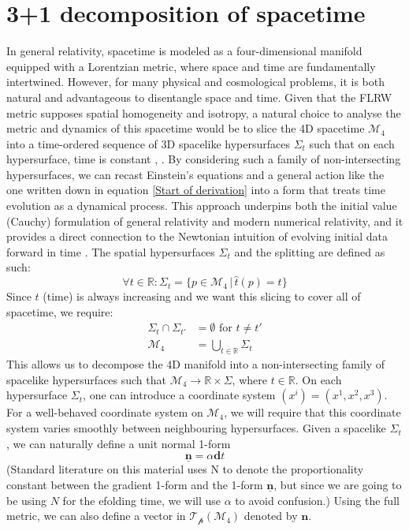 \documentclass[aps,prd,reprint,preprintnumbers,showpacs,floatfix,nofootinbib,superscript address]{revtex4-2}
\begin{document}
\section{3+1 decomposition of spacetime} \label{3+1 decomposition of spacetime}
In general relativity, spacetime is modeled as a four-dimensional manifold equipped with a Lorentzian metric, where space and time are fundamentally intertwined. However, for many physical and cosmological problems, it is both natural and advantageous to disentangle space and time. Given that the FLRW metric supposes spatial homogeneity and isotropy, a natural choice to analyse the metric and dynamics of this spacetime would be to slice the 4D spacetime $\mathcal{M}_4$ into a time-ordered sequence of 3D spacelike hypersurfaces $\Sigma_t$ such that on each hypersurface, time is constant \cite{baumann2012tasilecturesinflation}, 
\cite{gourgoulhon_31_2007}. By considering such a family of non-intersecting hypersurfaces, we can recast Einstein's equations and a general action like the one written down in equation \ref{Start of derivation} into a form that treats time evolution as a dynamical process. This approach underpins both the initial value (Cauchy) formulation of general relativity and modern numerical relativity, and it provides a direct connection to the Newtonian intuition of evolving initial data forward in time \cite{choquet-bruhat_global_1969}. The spatial hypersurfaces $\Sigma_t$ and the splitting are defined as such:
\begin{equation}
    \forall t \in \mathbb{R} : \Sigma_t = \{p \in \mathcal{M}_4 \, | \, \hat{t} (p) = t\} \nonumber
\end{equation}
Since $t$ (time) is always increasing and we want this slicing to cover all of spacetime, we require:
\begin{align}
    \Sigma_t \cap \Sigma_{t'} &= \emptyset \,\, \text{for}\,\, t \neq t' \nonumber \\
    \mathcal{M}_4 &= \bigcup_{t \in \mathbb{R}} \Sigma_t \nonumber
\end{align}
This allows us to decompose the 4D manifold into a non-intersecting family of spacelike hypersurfaces such that $\mathcal{M}_4 \rightarrow \mathbb{R} \times \Sigma$, where $t \in \mathbb{R}$. On each hypersurface $\Sigma_t$, one can introduce a coordinate system $(x^i) = (x^1,x^2,x^3)$. For a well-behaved coordinate system on $\mathcal{M}_4$, we will require that this coordinate system varies smoothly between neighbouring hypersurfaces. Given a spacelike $\Sigma_t$, we can naturally define a unit normal 1-form 
\begin{equation} \label{unit 1-form}
    \underline{\bm{n}} =  \alpha \textbf{d}t    
\end{equation}
(Standard literature on this material uses N to denote the proportionality constant between the gradient 1-form and the 1-form $\underline{\bm{n}}$, but since we are going to be using $N$ for the efolding time, we will use $\alpha$ to avoid confusion.) Using the full metric, we can also define a vector in $\mathcal{T_p}(\mathcal{M}_4)$ denoted by $\bm{n}$.
\end{document}
